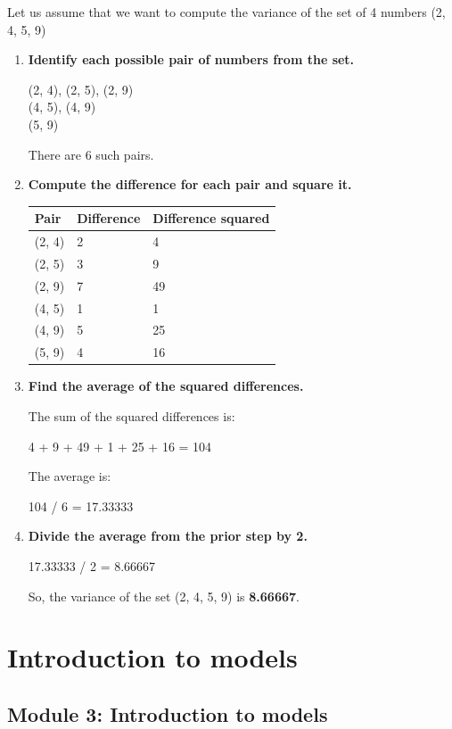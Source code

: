 \documentclass[
  12pt,
  letterpaper,
  DIV=11,
  numbers=noendperiod]{scrreprt}
\begin{document}
Let us assume that we want to compute the variance of the set of 4
numbers (2, 4, 5, 9)

\begin{enumerate}
\def\labelenumi{\arabic{enumi}.}
\item
  \textbf{Identify each possible pair of numbers from the set.}

  (2, 4), (2, 5), (2, 9)\\
  (4, 5), (4, 9)\\
  (5, 9)

  There are 6 such pairs.
\item
  \textbf{Compute the difference for each pair and square it.}

  \begin{longtable}[]{@{}lll@{}}
  \toprule\noalign{}
  Pair & Difference & Difference squared \\
  \midrule\noalign{}
  \endhead
  \bottomrule\noalign{}
  \endlastfoot
  (2, 4) & 2 & 4 \\
  (2, 5) & 3 & 9 \\
  (2, 9) & 7 & 49 \\
  (4, 5) & 1 & 1 \\
  (4, 9) & 5 & 25 \\
  (5, 9) & 4 & 16 \\
  \end{longtable}
\item
  \textbf{Find the average of the squared differences.}

  The sum of the squared differences is:

  4 + 9 + 49 + 1 + 25 + 16 = 104

  The average is:

  104 / 6 = 17.33333
\item
  \textbf{Divide the average from the prior step by 2.}

  17.33333 / 2 = 8.66667

  So, the variance of the set (2, 4, 5, 9) is \textbf{8.66667}.
\end{enumerate}

\part{Introduction to models}

\chapter*{Module 3: Introduction to
models}\label{module-3-introduction-to-models}
\end{document}
